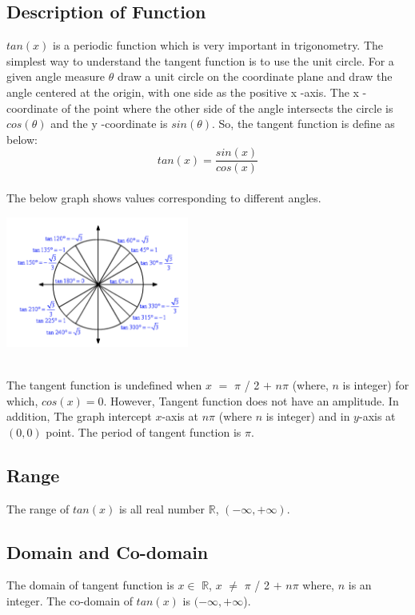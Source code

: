 \documentclass[letterpaper, 11pt]{report}
\begin{document}
\subsection*{Description of Function}
 \normalsize{ \cite{test1} $tan(x)$  is a periodic function which is very important in trigonometry. The simplest way to understand the tangent function is to use the unit circle. For a given angle measure $\theta$ draw a unit circle on the coordinate plane and draw the angle centered at the origin, with one side as the positive  x -axis. The  x -coordinate of the point where the other side of the angle intersects the circle is $cos(θ)$ and the  y -coordinate is $sin(θ)$. So, the tangent function is define as below: \[tan(x) = \frac{sin(x)}{cos(x)}\]\\}
The below graph shows values corresponding to different angles.
 \begin{center}
\includegraphics[width= 6cm]{images/tan3.png}
\end{center}
 \\
 \normalsize{ \cite{test1}\cite{varsitytutors}The tangent function is undefined when $x$ $=$ $\pi$ / 2 $+$ $n \pi$ (where, $n$ is integer) for which, $cos(x) = 0$. However, Tangent function does not have an amplitude. In addition, The graph intercept $x$-axis at $n\pi$ (where $n$ is integer) and in $y$-axis at $(0,0)$ point. The period of tangent function is $\pi$.
 }
 \\
 \subsection*{Range}\cite{test1}\cite{varsitytutors}
 \normalsize{ The range of $tan(x)$ is all real number $\mathbb{R}$, $(- \infty, + \infty)$. }
 
 \subsection*{Domain and Co-domain}\cite{test1}\cite{varsitytutors}
 \normalsize{The domain of tangent function is $x \in$ $\mathbb{R}$, $x$ $\neq$ $\pi$ / 2 $+$ $n \pi$ where, $n$ is an integer. The co-domain of $tan(x)$ is \((-\infty, +\infty\)).}
\end{document}
